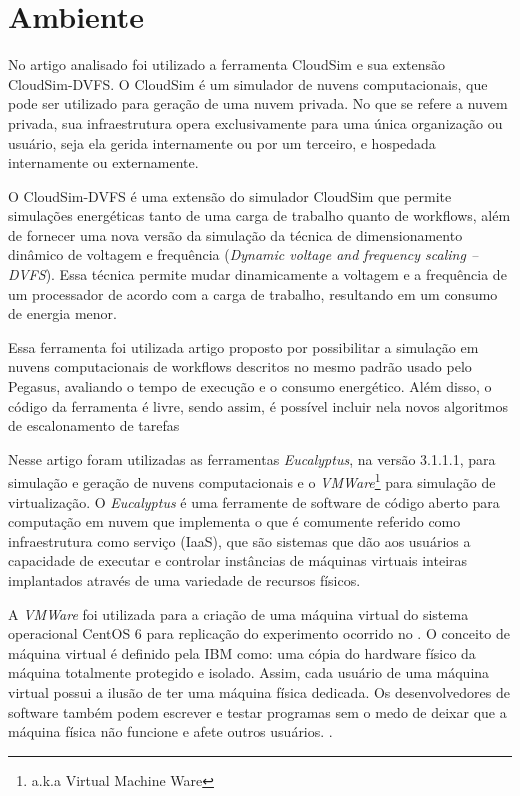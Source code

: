 \section{Ambiente}

No artigo analisado foi utilizado a ferramenta CloudSim e sua extensão CloudSim-DVFS. O CloudSim é
um simulador de nuvens computacionais, que pode ser utilizado para geração de uma nuvem privada.
No que se refere a nuvem privada, sua infraestrutura opera exclusivamente para uma única organização ou usuário,
seja ela gerida internamente ou por um terceiro, e hospedada internamente ou externamente.

O CloudSim-DVFS é uma extensão do simulador CloudSim que permite simulações energéticas tanto de uma
carga de trabalho quanto de workflows, além de fornecer uma nova versão da simulação da técnica
de dimensionamento dinâmico de voltagem e frequência (\textit{Dynamic voltage and frequency scaling – DVFS}).
Essa técnica permite mudar dinamicamente a voltagem e a frequência de um processador de acordo com
a carga de trabalho, resultando em um consumo de energia menor. \cite{elaine_et_al:14}

Essa ferramenta foi utilizada artigo proposto por possibilitar a simulação em nuvens computacionais
de workflows descritos no mesmo padrão usado pelo Pegasus, avaliando o tempo de execução e o consumo energético.
Além disso, o código da ferramenta é livre, sendo assim, é possível incluir nela novos algoritmos de escalonamento de tarefas

Nesse artigo foram utilizadas as ferramentas \textit{Eucalyptus}, na versão 3.1.1.1, para simulação e geração de nuvens computacionais
e o \textit{VMWare}\footnote{a.k.a Virtual Machine Ware} para simulação de virtualização. O \textit{Eucalyptus}
é uma ferramente de software de código aberto para computação em nuvem que implementa o que é comumente referido
como infraestrutura como serviço (IaaS), que são sistemas que dão aos usuários a capacidade de executar e controlar
instâncias de máquinas virtuais inteiras implantados através de uma variedade de recursos físicos. \cite{nurmi_2009}

A \textit{VMWare} foi utilizada para a criação de uma máquina virtual do sistema operacional CentOS 6 para replicação do experimento
ocorrido no \cite{elaine_et_al:14}. O conceito de máquina virtual é definido pela IBM como: uma cópia do hardware físico da máquina totalmente protegido
e isolado. Assim, cada usuário de uma máquina virtual possui a ilusão de ter uma máquina física dedicada.
Os desenvolvedores de software também podem escrever e testar programas sem o medo de deixar que a máquina física
não funcione e afete outros usuários. \cite{sugerman2001virtualizing}.
